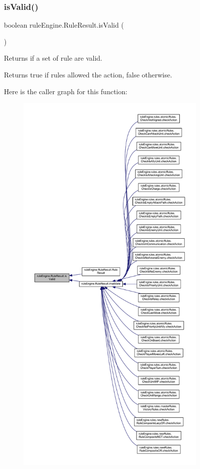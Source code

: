 \subsubsection{\texorpdfstring{is\+Valid()}{isValid()}}
{\footnotesize\ttfamily boolean rule\+Engine.\+Rule\+Result.\+is\+Valid (\begin{DoxyParamCaption}{ }\end{DoxyParamCaption})\hspace{0.3cm}{\ttfamily [inline]}}

Returns if a set of rule are valid.

\begin{DoxyReturn}{Returns}
true if rules allowed the action, false otherwise. 
\end{DoxyReturn}
Here is the caller graph for this function\+:
\nopagebreak
\begin{figure}[H]
\begin{center}
\leavevmode
\includegraphics[height=550pt]{classrule_engine_1_1_rule_result_a2cbcc84268db20bd941e6ff3ee648e6e_icgraph}
\end{center}
\end{figure}



